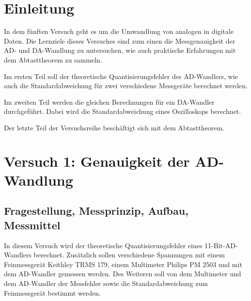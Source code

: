 \documentclass[12pt, oneside, a4paper, \docLanguage]{report}
\begin{document}

\setcounter{section}{0}



\clearpage

%
%


%
%


%
%


%
%




\setcounter{page}{1}
\pagestyle{default}
%
%
\chapter{Einleitung}
\label{chap:EINL}


In dem fünften Versuch geht es um die Umwandlung von analogen in digitale Daten. Die Lernziele dieses Versuches sind zum einen die Messgenauigkeit der AD- und DA-Wandlung zu untersuchen, wie auch praktische Erfahrungen mit dem Abtasttheorem zu sammeln.

Im ersten Teil soll der theoretische Quantisierungsfehler des AD-Wandlers, wie auch die Standardabweichung für zwei verschiedene Messgeräte berechnet werden.

Im zweiten Teil werden die gleichen Berechnungen für ein DA-Wandler durchgeführt. Dabei wird die Standardabweichung eines Oszilloskops berechnet.

Der letzte Teil der Versuchsreihe beschäftigt sich mit dem Abtasttheorem.

%
%
\chapter{Versuch 1: Genauigkeit der AD-Wandlung}
\label{chap:VERSUCH_1}

\section{Fragestellung, Messprinzip, Aufbau, Messmittel}
\label{chap:VERSUCH_1_FRAGESTELLUNG}
In diesem Versuch wird der theoretische Quantisierungsfehler eines 11-Bit-AD-Wandlers berechnet. Zusätzlich sollen verschiedene Spannungen mit einem Feinmessgerät Keithley TRMS 179, einem Multimeter Philips PM 2503 und mit dem AD-Wandler gemessen werden. Des Weiteren soll von dem Multimeter und dem AD-Wandler der Messfehler sowie die Standardabweichung zum Feinmessgerät bestimmt werden.
\end{document}

